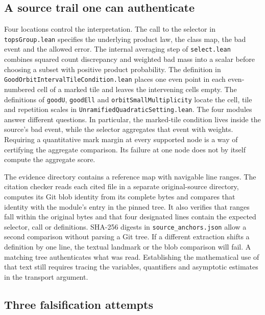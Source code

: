 \documentclass[12pt,letterpaper]{article}
\begin{document}
\subsection{A source trail one can authenticate}

Four locations control the interpretation. The call to the selector in \texttt{topsGroup.lean} specifies the underlying product law, the class map, the bad event and the allowed error. The internal averaging step of \texttt{select.lean} combines squared count discrepancy and weighted bad mass into a scalar before choosing a subset with positive product probability. The definition in \texttt{GoodOrbitIntervalTileCondition.lean} places one even point in each even-numbered cell of a marked tile and leaves the intervening cells empty. The definitions of \texttt{goodU}, \texttt{goodEll} and \texttt{orbitSmallMultiplicity} locate the cell, tile and repetition scales in \texttt{UnramifiedQuadraticSetting.lean}. The four modules answer different questions. In particular, the marked-tile condition lives inside the source's bad event, while the selector aggregates that event with weights. Requiring a quantitative mark margin at every supported node is a way of certifying the aggregate comparison. Its failure at one node does not by itself compute the aggregate score.

The evidence directory contains a reference map with navigable line ranges. The citation checker reads each cited file in a separate original-source directory, computes its Git blob identity from its complete bytes and compares that identity with the module's entry in the pinned tree. It also verifies that ranges fall within the original bytes and that four designated lines contain the expected selector, call or definitions. SHA-256 digests in \texttt{source\_anchors.json} allow a second comparison without parsing a Git tree. If a different extraction shifts a definition by one line, the textual landmark or the blob comparison will fail. A matching tree authenticates what was read. Establishing the mathematical use of that text still requires tracing the variables, quantifiers and asymptotic estimates in the transport argument.

\subsection{Three falsification attempts}
\end{document}
